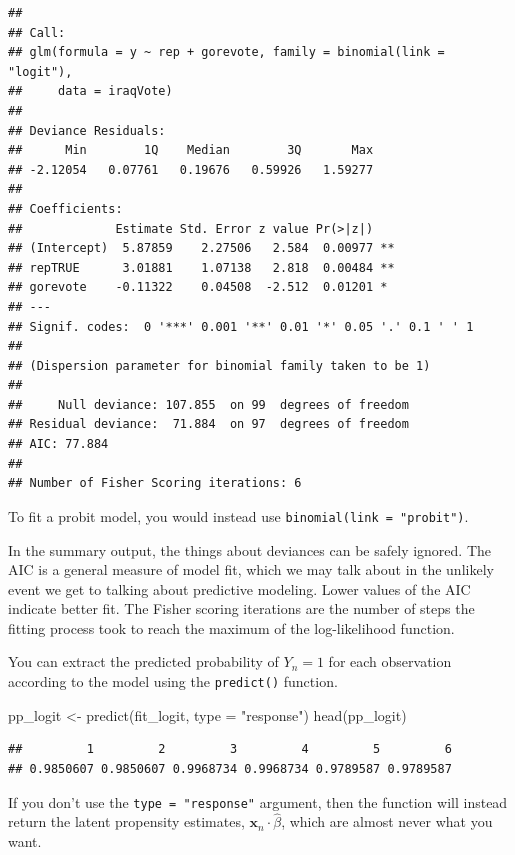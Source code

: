 \documentclass[
  12pt,
  oneside,openany]{book}
\newenvironment{Shaded}{\begin{snugshade}}{\end{snugshade}}
\newcommand{\AttributeTok}[1]{\textcolor[rgb]{0.77,0.63,0.00}{#1}}
\newcommand{\FunctionTok}[1]{\textcolor[rgb]{0.00,0.00,0.00}{#1}}
\newcommand{\NormalTok}[1]{#1}
\newcommand{\OtherTok}[1]{\textcolor[rgb]{0.56,0.35,0.01}{#1}}
\newcommand{\StringTok}[1]{\textcolor[rgb]{0.31,0.60,0.02}{#1}}
\begin{document}
\begin{verbatim}
## 
## Call:
## glm(formula = y ~ rep + gorevote, family = binomial(link = "logit"), 
##     data = iraqVote)
## 
## Deviance Residuals: 
##      Min        1Q    Median        3Q       Max  
## -2.12054   0.07761   0.19676   0.59926   1.59277  
## 
## Coefficients:
##             Estimate Std. Error z value Pr(>|z|)   
## (Intercept)  5.87859    2.27506   2.584  0.00977 **
## repTRUE      3.01881    1.07138   2.818  0.00484 **
## gorevote    -0.11322    0.04508  -2.512  0.01201 * 
## ---
## Signif. codes:  0 '***' 0.001 '**' 0.01 '*' 0.05 '.' 0.1 ' ' 1
## 
## (Dispersion parameter for binomial family taken to be 1)
## 
##     Null deviance: 107.855  on 99  degrees of freedom
## Residual deviance:  71.884  on 97  degrees of freedom
## AIC: 77.884
## 
## Number of Fisher Scoring iterations: 6
\end{verbatim}

To fit a probit model, you would instead use \texttt{binomial(link\ =\ "probit")}.

In the summary output, the things about deviances can be safely ignored.
The AIC is a general measure of model fit, which we may talk about in the unlikely event we get to talking about predictive modeling.
Lower values of the AIC indicate better fit.
The Fisher scoring iterations are the number of steps the fitting process took to reach the maximum of the log-likelihood function.

You can extract the predicted probability of \(Y_n = 1\) for each observation according to the model using the \texttt{predict()\textquotesingle{}} function.

\begin{Shaded}
\begin{Highlighting}[]
\NormalTok{pp\_logit }\OtherTok{\textless{}{-}} \FunctionTok{predict}\NormalTok{(fit\_logit, }\AttributeTok{type =} \StringTok{"response"}\NormalTok{)}
\FunctionTok{head}\NormalTok{(pp\_logit)}
\end{Highlighting}
\end{Shaded}

\begin{verbatim}
##         1         2         3         4         5         6 
## 0.9850607 0.9850607 0.9968734 0.9968734 0.9789587 0.9789587
\end{verbatim}

If you don't use the \texttt{type\ =\ "response"} argument, then the function will instead return the latent propensity estimates, \(\mathbf{x}_n \cdot \hat{\beta}\), which are almost never what you want.
\end{document}
